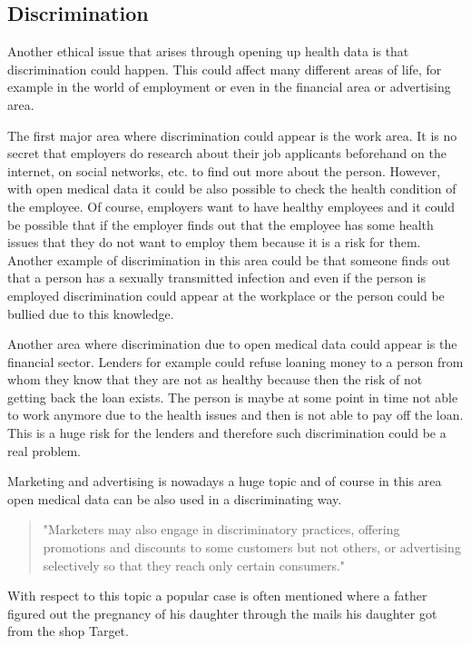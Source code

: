 \documentclass[a4paper, 11pt]{article}
\begin{document}
\subsection{Discrimination}
Another ethical issue that arises through opening up health data is that discrimination could happen. This could affect many different areas of life, for example in the world of employment or even in the financial area or advertising area. 

The first major area where discrimination could appear is the work area. It is no secret that employers do research about their job applicants beforehand on the internet, on social networks, etc. to find out more about the person. However, with open medical data it could be also possible to check the health condition of the employee. Of course, employers want to have healthy employees and it could be possible that if the employer finds out that the employee has some health issues that they do not want to employ them because it is a risk for them. Another example of discrimination in this area could be that someone finds out that  a person has a sexually transmitted infection and even if the person is employed discrimination could appear at the workplace or the person could be bullied due to this knowledge. \citet{price2019privacy}

Another area where discrimination due to open medical data could appear is the financial sector. Lenders for example could refuse loaning money to a person from whom they know that they are not as healthy because then the risk of not getting back the loan exists. The person is maybe at some point in time not able to work anymore due to the health issues and then is not able to pay off the loan. This is a huge risk for the lenders and therefore such discrimination could be a real problem. \citet{hoffman2016promise}

Marketing and advertising is nowadays a huge topic and of course in this area open medical data can be also used in a discriminating way. 
\begin{quote}
    "Marketers may also engage in discriminatory practices, offering promotions and discounts to some customers but not others, or advertising selectively so that they reach only certain consumers." \cite[p.\ 1779]{Hoffman2015}
\end{quote}
With respect to this topic a popular case is often mentioned where a father figured out the pregnancy of his daughter through the mails his daughter got from the shop Target. \cite{targetPregnantDaughter}
\end{document}
